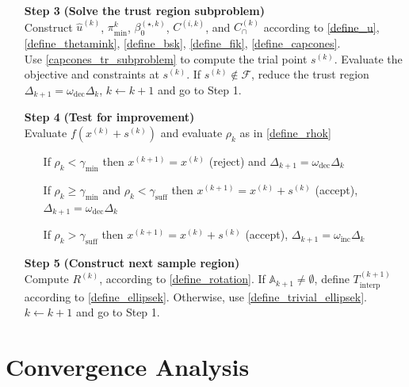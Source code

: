 \documentclass{article}
\theoremstyle{case}
\numberwithin{theorem}{subsection}
\newcommand{\activeconstraintskpo}{{\mathbb A_{k+1}}}
\newcommand{\bsk}{{\beta_0^{(\star, k)}}}
\newcommand{\capcones}{{C^{(k)}_{\cap}}}
\newcommand{\dk}{\Delta_k}
\newcommand{\dkpo}{\Delta_{k+1}}
\newcommand{\feasible}{{\mathcal F}}
\newcommand{\gammabi}{\gamma_{\textrm{suff}}}
\newcommand{\gammasm}{\gamma_{\textrm{min}}}
\newcommand{\huk}{{{\hat u}^{(k)}}}
\newcommand{\mfk}{{{m}_f}^{(k)}}
\newcommand{\omegadec}{\omega_{\text{dec}}}
\newcommand{\omegainc}{\omega_{\text{inc}}}
\newcommand{\rk}{\rho_k}
\newcommand{\rotk}{{R^{(k)}}}
\newcommand{\sampletrkpo}{{T_{\text{interp}}^{(k+1)}}}
\newcommand{\sk}{{{s}^{(k)}}}
\newcommand{\thetamink}{{\pi^k_{\textrm{min}}}}
\newcommand{\xkpo}{{{x}^{(k+1)}}}
\newcommand{\xk}{x^{(k)}}
\newcommand{\zik}{{z^{(i, k)}}}
\newcommand{\fik}{{C^{(i, k)}}}
\begin{document}
\begin{algorithm}[H]
\begin{itemize}
        \item[\textbf{Step 3}] \textbf{(Solve the trust region subproblem)} \\
        	Construct $\huk$, $\thetamink$, $\bsk$, $\fik$, and $\capcones$ according to
        	\cref{define_u}, \cref{define_thetamink}, \cref{define_bsk}, \cref{define_fik}, \cref{define_capcones}. \\
        	Use \cref{capcones_tr_subproblem} to compute the trial point $\sk$.
        	Evaluate the objective and constraints at $\sk$.
        	If $\sk \not \in \feasible$, reduce the trust region $\Delta_{k+1} = \omegadec\dk$, $k \gets k+1$ and go to Step 1.
            
        \item[\textbf{Step 4}] \textbf{(Test for improvement)} \\
            Evaluate $f(\xk + \sk)$ and evaluate $\rk$ as in \cref{define_rhok} \begin{itemize}
                \item[] If $\rk < \gammasm$ then $\xkpo=\xk$ (reject) and $\Delta_{k+1} = \omegadec\dk$
                \item[] If $\rk \ge \gammasm$ and $\rk < \gammabi$ then $\xkpo=\xk+\sk$ (accept), $\Delta_{k+1} = \omegadec\dk$
                \item[] If $\rk > \gammabi$ then $\xkpo=\xk+\sk$ (accept), $\Delta_{k+1} = \omegainc\dk$
            \end{itemize}
            
        \item[\textbf{Step 5}] \textbf{(Construct next sample region)} \\
        	Compute $\rotk$, according to \cref{define_rotation}.
        	If $\activeconstraintskpo \ne \emptyset$, define $\sampletrkpo$ according to \cref{define_ellipsek}.
        	Otherwise, use \cref{define_trivial_ellipsek}. \\
            $k \gets k+1$ and go to Step 1.
    \end{itemize}
\end{algorithm}

\section{Convergence Analysis}
\end{document}

